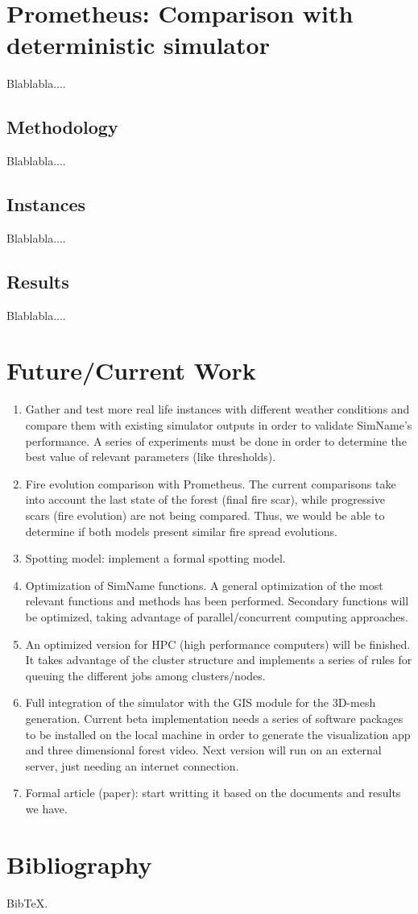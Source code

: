 \documentclass[11pt]{article}
\begin{document}
\newpage

\section{Prometheus: Comparison with deterministic simulator}
Blablabla....

\subsection{Methodology}
Blablabla....

\subsection{Instances}
Blablabla....

\subsection{Results}
Blablabla....

\newpage 

\section{Future/Current Work}
\begin{enumerate}
	\item Gather and test more real life instances with different weather conditions and compare them with existing simulator outputs in order to validate SimName's performance. A series of experiments must be done in order to determine the best value of relevant parameters (like thresholds).
	\item Fire evolution comparison with Prometheus. The current comparisons take into account the last state of the forest (final fire scar), while progressive scars (fire evolution) are not being compared. 	Thus, we would be able to determine if both models present similar fire spread evolutions.
	\item Spotting model: implement a formal spotting model. 
	\item Optimization of SimName functions. A general optimization of the most relevant functions and methods has been performed. Secondary functions will be optimized, taking advantage of parallel/concurrent computing approaches.
	\item An optimized version for HPC (high performance computers) will be finished. It takes advantage of the cluster structure and implements a series of rules for queuing the different jobs among clusters/nodes.
	\item Full integration of the simulator with the GIS module for the 3D-mesh generation. Current beta implementation needs a series of software packages to be installed on the local machine in order to generate the visualization app and three dimensional forest video. Next version will run on an external server, just needing an internet connection.
	\item Formal article (paper): start writting it based on the documents and results we have.
	
\end{enumerate}



\newpage 
\section{Bibliography}
BibTeX.




\newpage
\end{document}
